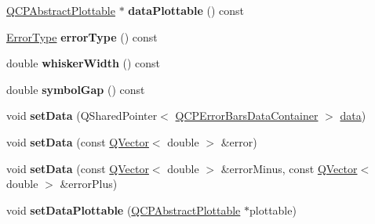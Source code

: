 \begin{DoxyCompactItemize}
\item 
\hyperlink{class_q_c_p_abstract_plottable}{Q\+C\+P\+Abstract\+Plottable} $\ast$ {\bfseries data\+Plottable} () const \hypertarget{class_q_c_p_error_bars_ad9e85b60a45022c1c3c88dd88693b465}{}\label{class_q_c_p_error_bars_ad9e85b60a45022c1c3c88dd88693b465}

\item 
\hyperlink{class_q_c_p_error_bars_a95f0220f11a72648b96480a85ce26474}{Error\+Type} {\bfseries error\+Type} () const \hypertarget{class_q_c_p_error_bars_a05020eba90982b7d1308560edc3ff59f}{}\label{class_q_c_p_error_bars_a05020eba90982b7d1308560edc3ff59f}

\item 
double {\bfseries whisker\+Width} () const \hypertarget{class_q_c_p_error_bars_acb67e100878a60bbe3118baf21d3b2e9}{}\label{class_q_c_p_error_bars_acb67e100878a60bbe3118baf21d3b2e9}

\item 
double {\bfseries symbol\+Gap} () const \hypertarget{class_q_c_p_error_bars_a5987a45043d4cc6425438ce2b96b6972}{}\label{class_q_c_p_error_bars_a5987a45043d4cc6425438ce2b96b6972}

\item 
void {\bfseries set\+Data} (Q\+Shared\+Pointer$<$ \hyperlink{class_q_vector}{Q\+C\+P\+Error\+Bars\+Data\+Container} $>$ \hyperlink{class_q_c_p_error_bars_ade69711ef3f9ec10e77d121fa2ba773b}{data})\hypertarget{class_q_c_p_error_bars_a92b1980003255f5f7c05407a4d92aabc}{}\label{class_q_c_p_error_bars_a92b1980003255f5f7c05407a4d92aabc}

\item 
void {\bfseries set\+Data} (const \hyperlink{class_q_vector}{Q\+Vector}$<$ double $>$ \&error)\hypertarget{class_q_c_p_error_bars_a2f33d68a7ec163b09017dce3d9d3abcc}{}\label{class_q_c_p_error_bars_a2f33d68a7ec163b09017dce3d9d3abcc}

\item 
void {\bfseries set\+Data} (const \hyperlink{class_q_vector}{Q\+Vector}$<$ double $>$ \&error\+Minus, const \hyperlink{class_q_vector}{Q\+Vector}$<$ double $>$ \&error\+Plus)\hypertarget{class_q_c_p_error_bars_aac0cf070b957c11177e91b02bcb433c8}{}\label{class_q_c_p_error_bars_aac0cf070b957c11177e91b02bcb433c8}

\item 
void {\bfseries set\+Data\+Plottable} (\hyperlink{class_q_c_p_abstract_plottable}{Q\+C\+P\+Abstract\+Plottable} $\ast$plottable)\hypertarget{class_q_c_p_error_bars_aabb42a964cfbf780cd1c79850c7cd989}{}\label{class_q_c_p_error_bars_aabb42a964cfbf780cd1c79850c7cd989}


\end{DoxyCompactItemize}
